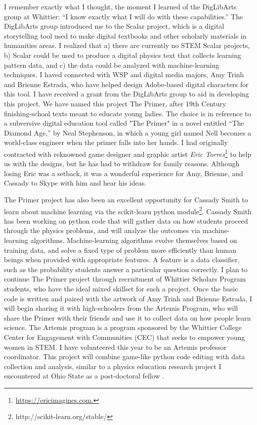 \documentclass[../../main.tex]{subfiles}
\begin{document}
I remember exactly what I thought, the moment I learned of the DigLibArts group at Whittier: ``I know exactly what I will do with these capabilities.''  The DigLibArts group introduced me to the Scalar project, which is a digital storytelling tool used to make digital textbooks and other scholarly materials in humanities areas.  I realized that a) there are currently no STEM Scalar projects, b) Scalar could be used to produce a digital physics text that collects learning pattern data, and c) the data could be analyzed with machine-learning techniques.  I haved connected with WSP and digital media majors, Amy Trinh and Brienne Estrada, who have helped design Adobe-based digital characters for this tool.  I have received a grant from the DigLibArts group to aid in developing this project.  We have named this project The Primer, after 19th Century finishing-school texts meant to educate young ladies.  The choice is in reference to a subversive digital education tool called "The Primer" in a novel entitled ``The Diamond Age,'' by Neal Stephenson, in which a young girl named Nell becomes a world-class engineer when the primer falls into her hands.  I had originally contracted with reknowned game designer and graphic artist \textit{Eric Torres}\footnote{\url{https://ericimagines.com.}} to help us with the designs, but he has had to withdraw for family reasons.  Although losing Eric was a setback, it was a wonderful experience for Amy, Brienne, and Cassady to Skype with him and hear his ideas.

The Primer project has also been an excellent opportunity for Cassady Smith to learn about machine learning via the scikit-learn python module\footnote{http://scikit-learn.org/stable/}.  Cassady Smith has been working on python code that will gather data on how students proceed through the physics problems, and will analyze the outcomes via machine-learning algorithms.  Machine-learning algorithms evolve themselves based on training data, and solve a fixed type of problem more efficiently than human beings when provided with appropriate features.  A feature is a data classifier, such as the probability students answer a particular question correctly.  I plan to continue The Primer project through recruitment of Whittier Scholars Program students, who have the ideal mixed skillset for such a project.  Once the basic code is written and paired with the artwork of Amy Trinh and Brienne Estrada, I will begin sharing it with high-schoolers from the Artemis Program, who will share the Primer with their friends and use it to collect data on how people learn science.  The Artemis program is a program sponsored by the Whittier College Center for Engagement with Communities (CEC) that seeks to empower young women in STEM.  I have volunteered this year to be an Artemis professor coordinator.  This project will combine game-like python code editing with data collection and analysis, similar to a physics education research project I encountered at Ohio State as a post-doctoral fellow \cite{orban2017a}.
\end{document}
